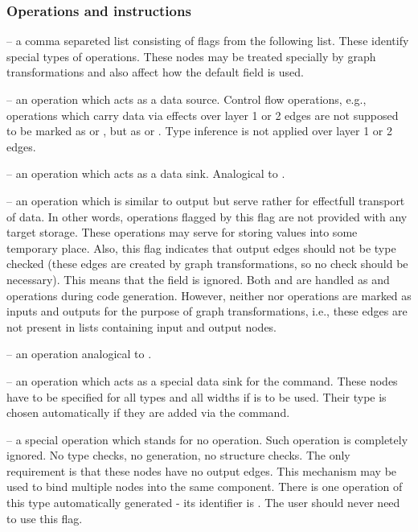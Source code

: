\subsubsection{Operations and instructions}
  \begin{description}
    \item {} -- a comma separeted list consisting of flags from the following list. These identify special types of operations. These nodes may be treated specially by graph transformations and also affect how the default  field is used.  
  \begin{description}
    \item {} -- an operation which acts as a data source. Control flow operations, e.g., operations which carry data via effects over layer 1 or 2 edges are not supposed to be marked as  or , but as  or . Type inference is not applied over layer 1 or 2 edges.
    \item {} -- an operation which acts as a data sink. Analogical to .
    \item {} -- an operation which is similar to output but serve rather for effectfull transport of data. In other words, operations flagged by this flag are not provided with any target storage. These operations may serve for storing values into some temporary place. Also, this flag indicates that output edges should not be type checked (these edges are created by graph transformations, so no check should be necessary). This means that the  field is ignored. Both  and  are handled as  and  operations during code generation. However, neither  nor  operations are marked as inputs and outputs for the purpose of graph transformations, i.e., these edges are not present in lists containing input and output nodes.
    \item {} -- an operation analogical to . 
    \item {} -- an operation which acts as a special data sink for the  command. These nodes have to be specified for all types and all widths if  is to be used. Their type is chosen automatically if they are added via the  command.
    \item {} -- a special operation which stands for no operation. Such operation is completely ignored. No type checks, no generation, no structure checks. The only requirement is that these nodes have no output edges. This mechanism may be used to bind multiple nodes into the same component. There is one operation of this type automatically generated - its identifier is . The user should never need to use this flag.

\end{description}
\end{description}
